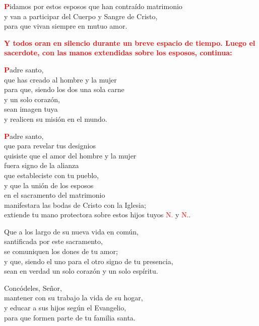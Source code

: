 \documentclass[12pt, letterpaper]{report}
\begin{document}
  \lettrine[lines=2]{\bfseries \textcolor{red}{P}}{}\Large idamos por estos esposos que han contra\'ido matrimonio \\
  y van a participar del Cuerpo y Sangre de Cristo, \\
  para que vivan siempre en mutuo amor.

  \large{\bfseries \textcolor{red}{Y todos oran en silencio durante un breve espacio de tiempo. Luego el sacerdote, con las manos extendidas sobre los esposos, continua:}}
  
  \lettrine[lines=2]{\bfseries \textcolor{red}{P}}{}\Large adre santo, \\
  que has creado al hombre y la mujer \\
  para que, siendo los dos una sola carne \\
  y un solo coraz\'on, \\
  sean imagen tuya \\
  y realicen su misi\'on en el mundo.

  \lettrine[lines=2]{\bfseries \textcolor{red}{P}}{}\Large adre santo, \\
  que para revelar tus designios \\
  quisiste que el amor del hombre y la mujer \\
  fuera signo de la alianza \\
  que estableciste con tu pueblo, \\
  y que la uni\'on de los esposos \\
  en el sacramento del matrimonio \\
  manifestara las bodas de Cristo con la Iglesia; \\
  extiende tu mano protectora sobre estos hijos tuyos \textcolor{red}{N.} y \textcolor{red}{N.}.

  Que a los largo de su nueva vida en com\'un, \\
  santificada por este sacramento, \\
  se comuniquen los dones de tu amor; \\
  y que, siendo el uno para el otro signo de tu presencia, \\
  sean en verdad un solo coraz\'on y un solo esp\'iritu.

  Conc\'odeles, Se\~nor, \\
  mantener con su trabajo la vida de su hogar, \\
  y educar a sus hijos seg\'un el Evangelio, \\
  para que formen parte de tu familia santa.
\end{document}
